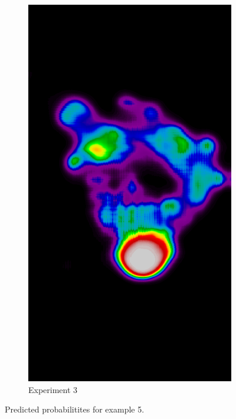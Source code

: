 \begin{figure}[h!]
\begin{subfigure}{0.195\textwidth}
			\includegraphics[width=\textwidth]{plots/examples/example5_probs_3.png}
		\caption{Experiment 3}
    \end{subfigure}
	\caption[Predictions for example 5]{Predicted probabilitites for example 5.}
\end{figure}
